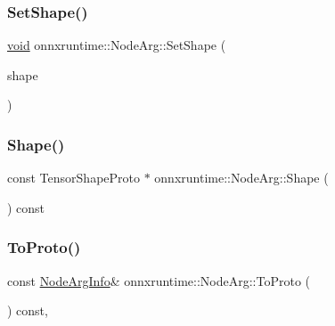 \mbox{\label{classonnxruntime_1_1NodeArg_ab39c6f852b796c2db48ed0af0feb5784}} 
\subsubsection{\texorpdfstring{Set\+Shape()}{SetShape()}}
{\footnotesize\ttfamily \mbox{\hyperlink{mlasi_8h_a88f941d423cb2a819b70a1358982b1a6}{void}} onnxruntime\+::\+Node\+Arg\+::\+Set\+Shape (\begin{DoxyParamCaption}\item[{const O\+N\+N\+X\+\_\+\+N\+A\+M\+E\+S\+P\+A\+C\+E\+::\+Tensor\+Shape\+Proto \&}]{shape }\end{DoxyParamCaption})}

\mbox{\label{classonnxruntime_1_1NodeArg_a923de298e44cb0620c0e4b5c7c7c88e4}} 
\subsubsection{\texorpdfstring{Shape()}{Shape()}}
{\footnotesize\ttfamily const Tensor\+Shape\+Proto $\ast$ onnxruntime\+::\+Node\+Arg\+::\+Shape (\begin{DoxyParamCaption}{ }\end{DoxyParamCaption}) const}

\mbox{\label{classonnxruntime_1_1NodeArg_a895f69c891315e9c304c1cc5aba31f65}} 
\subsubsection{\texorpdfstring{To\+Proto()}{ToProto()}}
{\footnotesize\ttfamily const \mbox{\hyperlink{namespaceonnxruntime_a86887111d4a0c110d744c19de4333c04}{Node\+Arg\+Info}}\& onnxruntime\+::\+Node\+Arg\+::\+To\+Proto (\begin{DoxyParamCaption}{ }\end{DoxyParamCaption}) const\hspace{0.3cm}{\ttfamily [inline]}, {\ttfamily [noexcept]}}

